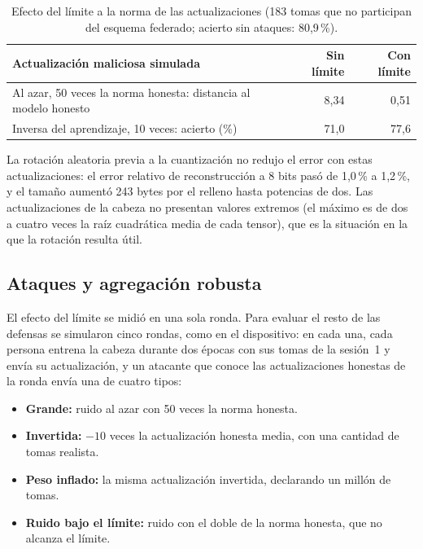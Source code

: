 \begin{table}[h]
    \centering
    \begin{tabular}{p{8.5cm}rr}
        \toprule
        Actualización maliciosa simulada & Sin límite & Con límite \\
        \midrule
        Al azar, 50 veces la norma honesta: distancia al modelo honesto & 8,34 & 0,51 \\
        Inversa del aprendizaje, 10 veces: acierto (\%) & 71,0 & 77,6 \\
        \bottomrule
    \end{tabular}
    \caption{Efecto del límite a la norma de las actualizaciones (183 tomas que no participan del esquema federado; acierto sin ataques: 80,9\,\%).}
    \label{tab:limite}
\end{table}

La rotación aleatoria previa a la cuantización no redujo el error con estas actualizaciones: el error relativo de reconstrucción a 8 bits pasó de 1,0\,\% a 1,2\,\%, y el tamaño aumentó 243 bytes por el relleno hasta potencias de dos. Las actualizaciones de la cabeza no presentan valores extremos (el máximo es de dos a cuatro veces la raíz cuadrática media de cada tensor), que es la situación en la que la rotación resulta útil.

\subsection{Ataques y agregación robusta}
\label{sec:res-ataques}

El efecto del límite se midió en una sola ronda. Para evaluar el resto de las defensas se simularon cinco rondas, como en el dispositivo: en cada una, cada persona entrena la cabeza durante dos épocas con sus tomas de la sesión~1 y envía su actualización, y un atacante que conoce las actualizaciones honestas de la ronda envía una de cuatro tipos:

\begin{itemize}
    \item \textbf{Grande:} ruido al azar con 50 veces la norma honesta.
    \item \textbf{Invertida:} $-10$ veces la actualización honesta media, con una cantidad de tomas realista.
    \item \textbf{Peso inflado:} la misma actualización invertida, declarando un millón de tomas.
    \item \textbf{Ruido bajo el límite:} ruido con el doble de la norma honesta, que no alcanza el límite.
\end{itemize}


